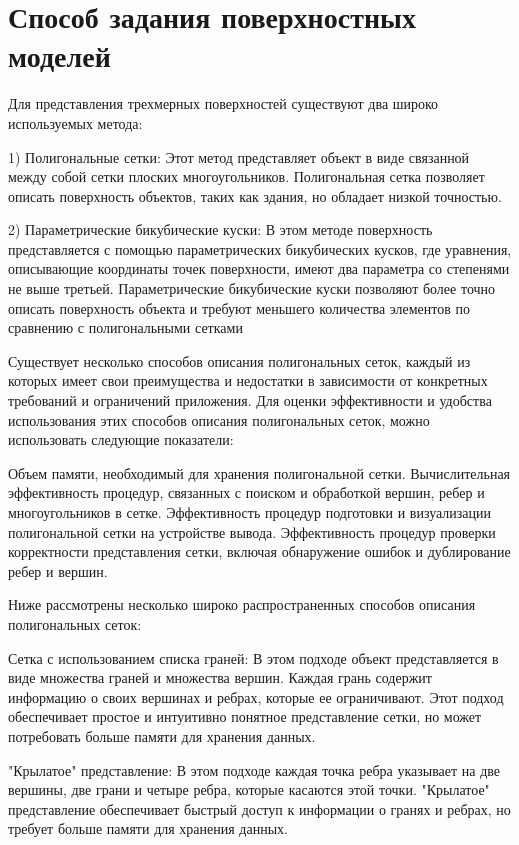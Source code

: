 \section{Способ задания поверхностных моделей}

Для представления трехмерных поверхностей существуют два широко используемых метода:

    1) Полигональные сетки: Этот метод представляет объект в виде связанной между собой сетки плоских многоугольников. Полигональная сетка позволяет описать поверхность объектов, таких как здания, но обладает низкой точностью.

    2) Параметрические бикубические куски: В этом методе поверхность представляется с помощью параметрических бикубических кусков, где уравнения, описывающие координаты точек поверхности, имеют два параметра со степенями не выше третьей. Параметрические бикубические куски позволяют более точно описать поверхность объекта и требуют меньшего количества элементов по сравнению с полигональными сетками

Существует несколько способов описания полигональных сеток, каждый из которых имеет свои преимущества и недостатки в зависимости от конкретных требований и ограничений приложения. Для оценки эффективности и удобства использования этих способов описания полигональных сеток, можно использовать следующие показатели:

    Объем памяти, необходимый для хранения полигональной сетки.
    Вычислительная эффективность процедур, связанных с поиском и обработкой вершин, ребер и многоугольников в сетке.
    Эффективность процедур подготовки и визуализации полигональной сетки на устройстве вывода.
    Эффективность процедур проверки корректности представления сетки, включая обнаружение ошибок и дублирование ребер и вершин.

Ниже рассмотрены несколько широко распространенных способов описания полигональных сеток:

    Сетка с использованием списка граней: В этом подходе объект представляется в виде множества граней и множества вершин. Каждая грань содержит информацию о своих вершинах и ребрах, которые ее ограничивают. Этот подход обеспечивает простое и интуитивно понятное представление сетки, но может потребовать больше памяти для хранения данных.

    "Крылатое" представление: В этом подходе каждая точка ребра указывает на две вершины, две грани и четыре ребра, которые касаются этой точки. "Крылатое" представление обеспечивает быстрый доступ к информации о гранях и ребрах, но требует больше памяти для хранения данных.

